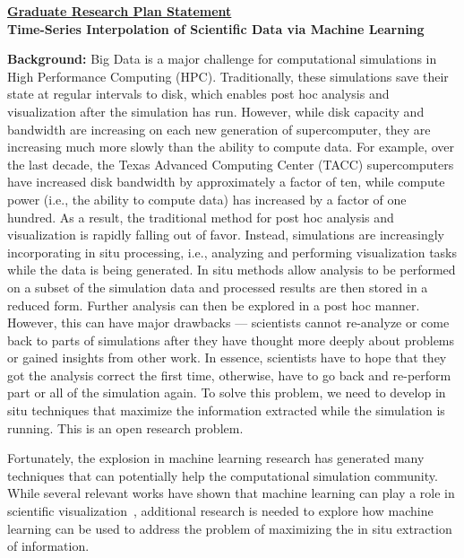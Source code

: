 \documentclass[12pt]{article}
\begin{document}
\begin{center}
\underline{\bf Graduate Research Plan Statement}\\
{\bf Time-Series Interpolation of Scientific Data via Machine Learning} \\
\end{center}


\textbf{Background:}
%
Big Data is a major challenge for computational simulations 
in High Performance Computing (HPC).
%
Traditionally, these simulations save their state at
regular intervals to disk, which enables post hoc analysis
and visualization after the simulation has run.
%
However, while disk capacity and bandwidth are increasing on each
new generation of supercomputer, they are increasing much more slowly
than the ability to compute data.
%
For example, over the last decade, the Texas Advanced Computing Center (TACC) 
supercomputers have increased disk bandwidth by approximately a factor of ten, 
while compute power (i.e., the ability to compute data) has increased by a 
factor of one hundred.
%
%
As a result, the traditional method for post hoc analysis and visualization
is rapidly falling out of favor. Instead, simulations are increasingly
incorporating in situ processing,
i.e., analyzing and performing
visualization tasks while the data is being generated. 
%
In situ methods allow analysis to be performed on a subset of the 
simulation data and processed results are then stored in a reduced form. Further
analysis can then be explored in a post hoc manner. 
%
However, this can have major
drawbacks --- scientists cannot re-analyze or come back to parts of
simulations after they have thought more deeply about problems or gained insights
from other work. 
%
In essence, scientists have to hope that they got the analysis
correct the first time, otherwise, have to go back and re-perform part or all of
the simulation again. 
%
To solve this problem, we need to develop in situ techniques that maximize the information 
extracted while the simulation is running.
%
This is an open research problem.

Fortunately, the explosion in machine learning research has generated many
techniques that can potentially help the computational simulation
community. 
%
While several relevant works have shown that machine learning can play a role in scientific
visualization~\cite{He,super}, additional research is needed to explore how
machine learning can be used to address the problem of maximizing the in situ 
extraction of information.
\end{document}
